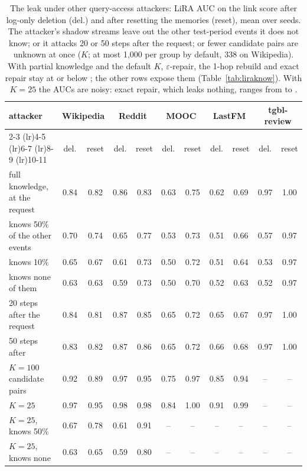 \begin{table}[t]
\centering\scriptsize
\caption{The leak under other query-access attackers: LiRA AUC on the link score after log-only deletion (del.) and after
resetting the memories (reset), mean over seeds. The attacker's shadow streams leave out the other test-period events it does
not know; or it attacks 20 or 50 steps after the request; or fewer candidate pairs are unknown at once ($K$; at most 1{,}000
per group by default, 338 on Wikipedia). With partial knowledge and the default $K$, $\varepsilon$-repair, the 1-hop rebuild and
exact repair stay at or below \PartialApproxMax{}; the other rows expose them (Table~\ref{tab:liraknow}). With $K=25$ the AUCs are
noisy: exact repair, which leaks nothing, ranges from \ExactKTwentyFiveMin{} to \ExactKTwentyFiveMax.}
\label{tab:robust}
\setlength{\tabcolsep}{3pt}
\begin{tabular}{@{}lcccccccccc@{}}
\toprule
attacker & \multicolumn{2}{c}{Wikipedia} & \multicolumn{2}{c}{Reddit} & \multicolumn{2}{c}{MOOC} & \multicolumn{2}{c}{LastFM} & \multicolumn{2}{c}{tgbl-review} \\
\cmidrule(lr){2-3} \cmidrule(lr){4-5} \cmidrule(lr){6-7} \cmidrule(lr){8-9} \cmidrule(lr){10-11}
 & del. & reset & del. & reset & del. & reset & del. & reset & del. & reset \\
\midrule
full knowledge, at the request & 0.84 & 0.82 & 0.86 & 0.83 & 0.63 & 0.75 & 0.62 & 0.69 & 0.97 & 1.00 \\
knows 50\% of the other events & 0.70 & 0.74 & 0.65 & 0.77 & 0.53 & 0.73 & 0.51 & 0.66 & 0.57 & 0.97 \\
knows 10\% & 0.65 & 0.67 & 0.61 & 0.73 & 0.50 & 0.72 & 0.51 & 0.64 & 0.53 & 0.97 \\
knows none of them & 0.63 & 0.63 & 0.59 & 0.73 & 0.50 & 0.70 & 0.52 & 0.63 & 0.52 & 0.97 \\
20 steps after the request & 0.84 & 0.81 & 0.87 & 0.85 & 0.65 & 0.72 & 0.65 & 0.67 & 0.97 & 1.00 \\
50 steps after & 0.83 & 0.82 & 0.87 & 0.86 & 0.65 & 0.72 & 0.66 & 0.68 & 0.97 & 1.00 \\
$K=100$ candidate pairs & 0.92 & 0.89 & 0.97 & 0.95 & 0.75 & 0.97 & 0.85 & 0.94 & -- & -- \\
$K=25$ & 0.97 & 0.95 & 0.98 & 0.98 & 0.84 & 1.00 & 0.91 & 0.99 & -- & -- \\
$K=25$, knows 50\% & 0.67 & 0.78 & 0.61 & 0.91 & -- & -- & -- & -- & -- & -- \\
$K=25$, knows none & 0.63 & 0.65 & 0.59 & 0.80 & -- & -- & -- & -- & -- & -- \\
\bottomrule
\end{tabular}
\end{table}
